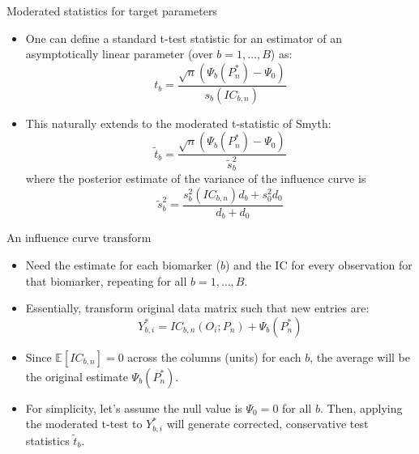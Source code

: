 \documentclass[12pt,t]{beamer}
\begin{document}
\begin{frame}[c]{Moderated statistics for target parameters}

\begin{center}
\begin{itemize}
  \itemsep12pt
  \item One can define a standard t-test statistic for an estimator of an
    asymptotically linear parameter (over $b = 1, \dots, B$) as:
    \[
      t_b = \frac{\sqrt{n}(\Psi_b(P_n^*) - \Psi_0)}{s_b(IC_{b,n})}
    \]
  \item This naturally extends to the moderated t-statistic of Smyth:
    \[
      \tilde{t}_b = \frac{\sqrt{n}(\Psi_b(P_n^*) - \Psi_0)}{\tilde{s}_b^2}
    \]
    where the posterior estimate of the variance of the influence curve is
    \[
      \tilde{s}^2_b = \frac{s^2_b(IC_{b,n})d_b + s^2_0d_0}{d_b + d_0}
    \]
\end{itemize}
\end{center}

\end{frame}



\begin{frame}[c]{An influence curve transform}

\begin{center}
\begin{itemize}
  \itemsep12pt
  \item Need the estimate for each biomarker ($b$) and the IC for every
    observation for that biomarker, repeating for all $b = 1, \dots, B$.
  \item Essentially, transform original data matrix such that new entries are:
    \[
      Y^*_{b,i} = IC_{b,n}(O_i; P_n) + \Psi_b(P_n^*)
     \]
 \item Since $\mathbb{E}[IC_{b,n}] = 0$ across the columns (units) for each $b$,
   the average will be the original estimate $\Psi_b(P_n^*)$.
  \item For simplicity, let's assume the null value is $\Psi_0 = 0$ for all $b$.
    Then, applying the moderated t-test to $Y^*_{b,i}$ will generate corrected,
    conservative test statistics $\tilde{t}_b$.
\end{itemize}
\end{center}

\end{frame}
\end{document}
